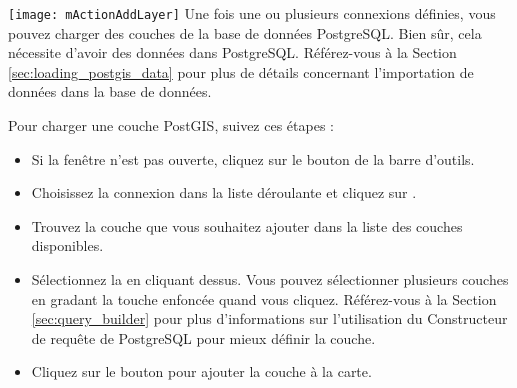 \texttt{[image: mActionAddLayer]} Une fois une ou plusieurs connexions définies, vous pouvez charger des couches de la base de données PostgreSQL. Bien sûr, cela nécessite d'avoir des données dans PostgreSQL. Référez-vous à la Section \ref{sec:loading_postgis_data} pour plus de détails concernant l'importation de données dans la base de données.

Pour charger une couche PostGIS, suivez ces étapes :

\begin{itemize}
\item Si la fenêtre  n'est pas ouverte, cliquez sur le bouton  de la barre d'outils.
\item Choisissez la connexion dans la liste déroulante et cliquez sur .
\item Trouvez la couche que vous souhaitez ajouter dans la liste des couches disponibles.
\item Sélectionnez la en cliquant dessus. Vous pouvez sélectionner plusieurs couches en gradant la touche  enfoncée quand vous cliquez. Référez-vous à la Section \ref{sec:query_builder} pour plus d'informations sur l'utilisation du Constructeur de requête de PostgreSQL pour mieux définir la couche.
\item Cliquez sur le bouton  pour ajouter la couche à la carte.
\end{itemize}

